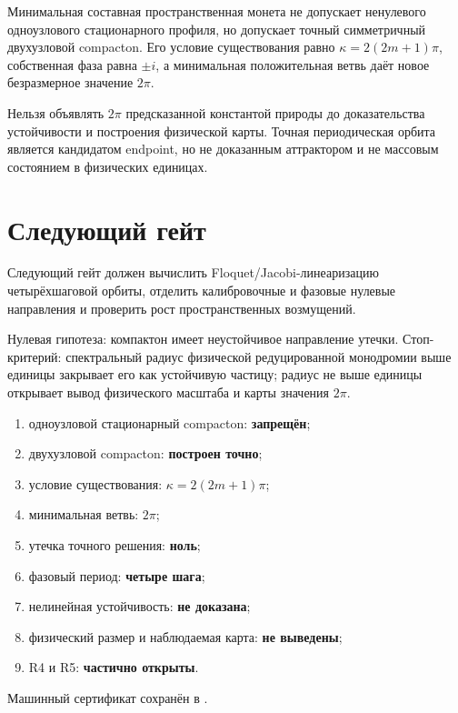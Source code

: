 \begin{theorem}
Минимальная составная пространственная монета не допускает ненулевого
одноузлового стационарного профиля, но допускает точный симметричный
двухузловой compacton. Его условие существования равно
$\kappa=2(2m+1)\pi$, собственная фаза равна $\pm i$, а минимальная
положительная ветвь даёт новое безразмерное значение $2\pi$.
\end{theorem}

\begin{nogocriterion}
Нельзя объявлять $2\pi$ предсказанной константой природы до доказательства
устойчивости и построения физической карты. Точная периодическая орбита
является кандидатом endpoint, но не доказанным аттрактором и не массовым
состоянием в физических единицах.
\end{nogocriterion}

\section{Следующий гейт}

Следующий гейт
должен вычислить Floquet/Jacobi-линеаризацию четырёхшаговой орбиты,
отделить калибровочные и фазовые нулевые направления и проверить рост
пространственных возмущений.

Нулевая гипотеза: компактон имеет неустойчивое направление утечки.
Стоп-критерий: спектральный радиус физической редуцированной монодромии
выше единицы закрывает его как устойчивую частицу; радиус не выше единицы
открывает вывод физического масштаба и карты значения $2\pi$.

\begin{protocol}
\begin{enumerate}
 \item одноузловой стационарный compacton: \textbf{запрещён};
 \item двухузловой compacton: \textbf{построен точно};
 \item условие существования: \textbf{$\kappa=2(2m+1)\pi$};
 \item минимальная ветвь: \textbf{$2\pi$};
 \item утечка точного решения: \textbf{ноль};
 \item фазовый период: \textbf{четыре шага};
 \item нелинейная устойчивость: \textbf{не доказана};
 \item физический размер и наблюдаемая карта: \textbf{не выведены};
 \item R4 и R5: \textbf{частично открыты}.
\end{enumerate}
\end{protocol}

Машинный сертификат сохранён в
.